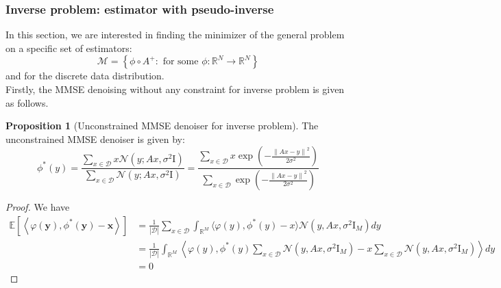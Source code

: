 \documentclass[a4paper,10pt]{article}
\theoremstyle{definition} %
\theoremstyle{definition} %
\newtheorem{proposition}[definition]{Proposition}
\theoremstyle{definition} %
\theoremstyle{definition} %
\newcommand{\R}{\mathbb{R}}
\newcommand{\E}[1]{\mathbb{E} \left[ {#1} \right] }
\newcommand{\Normal}[1]{\mathcal{N}\left( {#1} \right)}
\newcommand{\Id}{\mathrm{I}}
\newcommand{\norm}[1]{\left\| #1 \right \|}
\newcommand{\inner}[1]{\left\langle #1 \right\rangle}
\newcommand{\M}{\mathcal{M}}
\newcommand{\x}{\boldsymbol{x}}
\newcommand{\y}{\boldsymbol{y}}
\newcommand{\0}{\boldsymbol{0}}
\newcommand{\D}{\mathcal{D}}
\begin{document}


\subsubsection{Inverse problem: estimator with pseudo-inverse}
In this section, we are interested in finding the minimizer of the general problem  on a specific set of estimators:
\begin{equation*}
    \M = \left\{ \phi \circ A^+: \mbox{ for some } \phi: \R^N \to \R^N \right\}
\end{equation*}
and for the discrete data distribution. 
\\Firstly, the MMSE denoising without any constraint for inverse problem is given as follows.
\begin{proposition}[Unconstrained MMSE denoiser for inverse problem]
    The unconstrained MMSE denoiser is given by:
    \begin{equation}
        \phi^{*}(y) =  \frac{\sum_{x \in \D} x \Normal{y; A x, \sigma^2 \Id}}{\sum_{x \in \D} \Normal{y; A x, \sigma^2 \Id}} =   \frac{\sum_{x \in \D} x \exp \left( -\frac{\norm{A x - y}^2}{2 \sigma^2} \right) }{\sum_{x \in \D}  \exp \left( -\frac{\norm{A x - y}^2}{2 \sigma^2} \right) }
    \end{equation}
\end{proposition}
\begin{proof}
    We have
    \begin{align*}
        \E{\inner{\varphi(\y), \phi^*(\y) - \x}} &=\frac{1}{|\D|}\sum_{x\in\D}\int_{\R^M} \langle \varphi(y), \phi^*(y)-x\rangle \Normal{y,Ax,\sigma^2 \Id_M} dy\\
        &= \frac{1}{|\D|}\int_{\R^M} \left\langle \varphi(y), \phi^*(y) \sum_{x\in\D}\Normal{y,Ax,\sigma^2 \Id_M}-x \sum_{x\in\D}\Normal{y,Ax,\sigma^2 \Id_M}\right\rangle dy\\
        &=0
    \end{align*} 
\end{proof}
\end{document}
